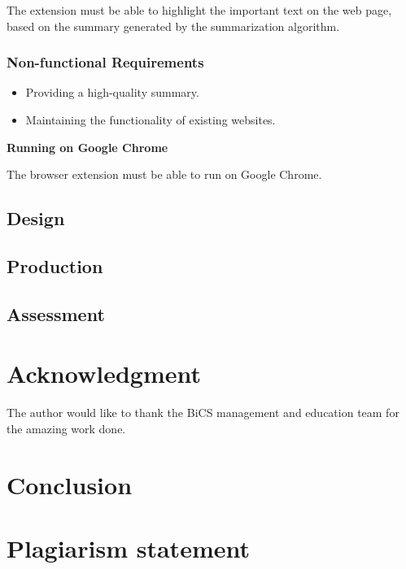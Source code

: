 \documentclass[conference,compsoc]{IEEEtran}
\begin{document}
The extension must be able to highlight the important text on the web page, based on the summary generated by the summarization algorithm.

\subsubsection{Non-functional Requirements}
\begin{itemize}
  \item Providing a high-quality summary.
  \item Maintaining the functionality of existing websites.
\end{itemize}

\vspace{0.4cm}
\textbf{Running on Google Chrome}

The browser extension must be able to run on Google Chrome.


\subsection{Design}


\subsection{Production}


\subsection{Assessment}


\section*{Acknowledgment}
The author would like to thank the BiCS management and education team for the amazing work done.


\section{Conclusion}


\newpage


\section{Plagiarism statement}
\end{document}
